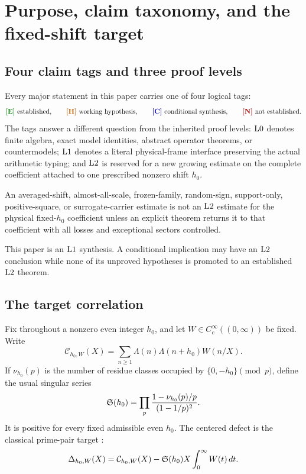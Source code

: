 \section{Purpose, claim taxonomy, and the fixed-shift target}
\label{sec:scope-target}

\subsection{Four claim tags and three proof levels}

Every major statement in this paper carries one of four logical tags:
\[
\Etag\ \text{established},\qquad
\Htag\ \text{working hypothesis},\qquad
\Ctag\ \text{conditional synthesis},\qquad
\Ntag\ \text{not established}.
\]
The tags answer a different question from the inherited proof levels:
\(\mathrm{L0}\) denotes finite algebra, exact model identities, abstract
operator theorems, or countermodels; \(\mathrm{L1}\) denotes a literal
physical-frame interface preserving the actual arithmetic typing; and
\(\mathrm{L2}\) is reserved for a new growing estimate on the complete
coefficient attached to one prescribed nonzero shift \(h_0\).

\begin{definition}
\label{def:promotion}
An averaged-shift, almost-all-scale, frozen-family, random-sign,
support-only, positive-square, or surrogate-carrier estimate is not an
\(\mathrm{L2}\) estimate for the physical fixed-\(h_0\) coefficient unless
an explicit theorem returns it to that coefficient with all losses
and exceptional sectors controlled.
\end{definition}

This paper is an \(\mathrm{L1}\) synthesis.  A conditional implication may
have an \(\mathrm{L2}\) conclusion while none of its unproved hypotheses is
promoted to an established \(\mathrm{L2}\) theorem.

\subsection{The target correlation}

Fix throughout a nonzero even integer \(h_0\), and let
\(W\in C_c^\infty((0,\infty))\) be fixed.  Write
\[
\mathcal C_{h_0,W}(X)
=
\sum_{n\ge1}\Lambda(n)\Lambda(n+h_0)W(n/X).
\]
If \(\nu_{h_0}(p)\) is the number of residue classes occupied by
\(\{0,-h_0\}\pmod p\), define the usual singular series
\[
\mathfrak S(h_0)
=
\prod_p
\frac{1-\nu_{h_0}(p)/p}{(1-1/p)^2}.
\]
It is positive for every fixed admissible even \(h_0\).  The centered
defect is the classical prime-pair target
\cite{HardyLittlewood1923,FriedlanderIwaniec2010}:
\begin{equation}
\Delta_{h_0,W}(X)
=
\mathcal C_{h_0,W}(X)
-\mathfrak S(h_0)X\int_0^\infty W(t)\,dt.
\label{eq:defect}
\end{equation}

